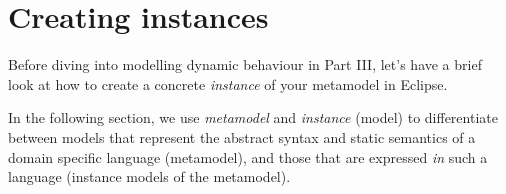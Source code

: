 \newpage
\genHeader

\section{Creating instances}

Before diving into modelling dynamic behaviour in Part III, let's have a brief look at how to create a concrete \emph{instance} of your metamodel in Eclipse.

\vspace{0.5cm}

In the following section, we use \emph{metamodel} and \emph{instance} (model) to differentiate between models that represent the abstract syntax and static
semantics of a domain specific language (metamodel), and those that are expressed \emph{in} such a language (instance models of the metamodel).

